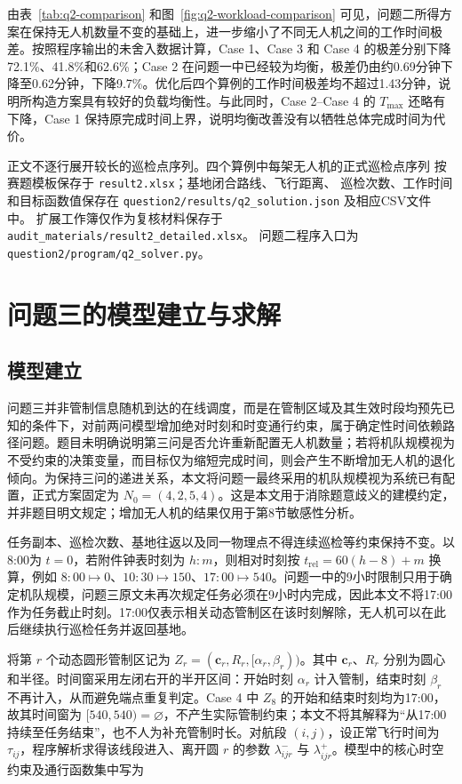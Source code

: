 \documentclass[UTF8,a4paper,12pt]{ctexart}
\numberwithin{equation}{section}
\numberwithin{equation}{section}
\begin{document}
由表~\ref{tab:q2-comparison} 和图~\ref{fig:q2-workload-comparison} 可见，问题二所得方案在保持无人机数量不变的基础上，进一步缩小了不同无人机之间的工作时间极差。按照程序输出的未舍入数据计算，Case 1、Case 3 和 Case 4 的极差分别下降72.1\%、41.8\%和62.6\%；Case 2 在问题一中已经较为均衡，极差仍由约0.69分钟下降至0.62分钟，下降9.7\%。优化后四个算例的工作时间极差均不超过1.43分钟，说明所构造方案具有较好的负载均衡性。与此同时，Case 2--Case 4 的 \(T_{\max}\) 还略有下降，Case 1 保持原完成时间上界，说明均衡改善没有以牺牲总体完成时间为代价。

正文不逐行展开较长的巡检点序列。四个算例中每架无人机的正式巡检点序列
按赛题模板保存于 \texttt{result2.xlsx}；基地闭合路线、飞行距离、
巡检次数、工作时间和目标函数值保存在
\nolinkurl{question2/results/q2_solution.json} 及相应CSV文件中。
扩展工作簿仅作为复核材料保存于
\nolinkurl{audit_materials/result2_detailed.xlsx}。
问题二程序入口为
\nolinkurl{question2/program/q2_solver.py}。

\section{问题三的模型建立与求解}
\subsection{模型建立}

问题三并非管制信息随机到达的在线调度，而是在管制区域及其生效时段均预先已知的条件下，对前两问模型增加绝对时刻和时变通行约束，属于确定性时间依赖路径问题\cite{gendreau2015time}。题目未明确说明第三问是否允许重新配置无人机数量；若将机队规模视为不受约束的决策变量，而目标仅为缩短完成时间，则会产生不断增加无人机的退化倾向。为保持三问的递进关系，本文将问题一最终采用的机队规模视为系统已有配置，正式方案固定为 $N_0=(4,2,5,4)$。这是本文用于消除题意歧义的建模约定，并非题目明文规定；增加无人机的结果仅用于第8节敏感性分析。

任务副本、巡检次数、基地往返以及同一物理点不得连续巡检等约束保持不变。以8:00为 $t=0$，若附件钟表时刻为 $h{:}m$，则相对时刻按 $t_{\mathrm{rel}}=60(h-8)+m$ 换算，例如 $8{:}00\mapsto0$、$10{:}30\mapsto150$、$17{:}00\mapsto540$。问题一中的9小时限制只用于确定机队规模，问题三原文未再次规定任务必须在9小时内完成，因此本文不将17:00作为任务截止时刻。17:00仅表示相关动态管制区在该时刻解除，无人机可以在此后继续执行巡检任务并返回基地。

将第 $r$ 个动态圆形管制区记为 $Z_r=(\boldsymbol c_r,R_r,[\alpha_r,\beta_r))$。其中 $\boldsymbol c_r$、$R_r$ 分别为圆心和半径。时间窗采用左闭右开的半开区间：开始时刻 $\alpha_r$ 计入管制，结束时刻 $\beta_r$ 不再计入，从而避免端点重复判定。Case 4 中 $Z_8$ 的开始和结束时刻均为17:00，故其时间窗为 $[540,540)=\varnothing$，不产生实际管制约束；本文不将其解释为“从17:00持续至任务结束”，也不人为补充管制时长。对航段 $(i,j)$，设正常飞行时间为 $\tau_{ij}$，程序解析求得该线段进入、离开圆 $r$ 的参数 $\lambda_{ijr}^{-}$ 与 $\lambda_{ijr}^{+}$。模型中的核心时空约束及通行函数集中写为
\end{document}
